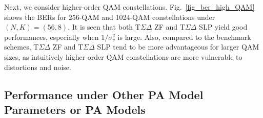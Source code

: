 \documentclass[10pt,twocolumn,twoside]{IEEEtran}
\begin{document}
Next, we consider  higher-order QAM constellations.
Fig.~\ref{fig_ber_high_QAM} shows the BERs for 256-QAM and 1024-QAM constellations under $(N,K) = (56,8)$.
It is seen that both T$\Sigma \Delta$ ZF and T$\Sigma \Delta$ SLP yield good performances, especially when $1/\sigma_v^2$ is large.
Also, compared to the benchmark schemes, T$\Sigma \Delta$ ZF and T$\Sigma \Delta$ SLP tend to be more advantageous for larger QAM sizes, as intuitively higher-order QAM constellations are more vulnerable to distortions and noise.













\subsection{Performance under Other PA Model Parameters or PA Models}
\end{document}
